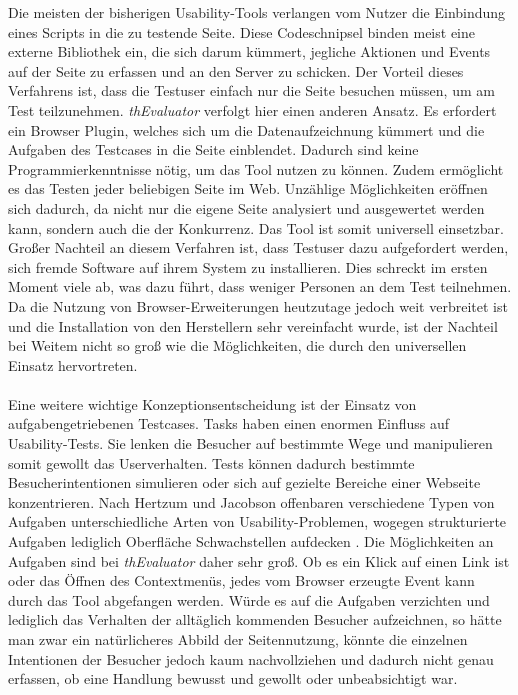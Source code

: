 Die meisten der bisherigen Usability-Tools verlangen vom Nutzer die Einbindung eines Scripts in die zu testende Seite. Diese Codeschnipsel binden meist eine externe Bibliothek ein, die sich darum kümmert, jegliche Aktionen und Events auf der Seite zu erfassen und an den Server zu schicken. Der Vorteil dieses Verfahrens ist, dass die Testuser einfach nur die Seite besuchen müssen, um am Test teilzunehmen. \textit{thEvaluator} verfolgt hier einen anderen Ansatz. Es erfordert ein Browser Plugin, welches sich um die Datenaufzeichnung kümmert und die Aufgaben des Testcases in die Seite einblendet. Dadurch sind keine Programmierkenntnisse nötig, um das Tool nutzen zu können. Zudem ermöglicht es das Testen jeder beliebigen Seite im Web. Unzählige Möglichkeiten eröffnen sich dadurch, da nicht nur die eigene Seite analysiert und ausgewertet werden kann, sondern auch die der Konkurrenz. Das Tool ist somit universell einsetzbar. Großer Nachteil an diesem Verfahren ist, dass Testuser dazu aufgefordert werden, sich fremde Software auf ihrem System zu installieren. Dies schreckt im ersten Moment viele ab, was dazu führt, dass weniger Personen an dem Test teilnehmen. Da die Nutzung von Browser-Erweiterungen heutzutage jedoch weit verbreitet ist und die Installation von den Herstellern sehr vereinfacht wurde, ist der Nachteil bei Weitem nicht so groß wie die Möglichkeiten, die durch den universellen Einsatz hervortreten.\\
\\
Eine weitere wichtige Konzeptionsentscheidung ist der Einsatz von aufgabengetriebenen Testcases. Tasks haben einen enormen Einfluss auf Usability-Tests. Sie lenken die Besucher auf bestimmte Wege und manipulieren somit gewollt das Userverhalten. Tests können dadurch bestimmte Besucherintentionen simulieren oder sich auf gezielte Bereiche einer Webseite konzentrieren. Nach Hertzum und Jacobson offenbaren verschiedene Typen von Aufgaben unterschiedliche Arten von Usability-Problemen, wogegen strukturierte Aufgaben lediglich Oberfläche Schwachstellen aufdecken \cite{anzahlTestpersonen}. Die Möglichkeiten an Aufgaben sind bei \textit{thEvaluator} daher sehr groß. Ob es ein Klick auf einen Link ist oder das Öffnen des Contextmenüs, jedes vom Browser erzeugte Event kann durch das Tool abgefangen werden. Würde es auf die Aufgaben verzichten und lediglich das Verhalten der alltäglich kommenden Besucher aufzeichnen, so hätte man zwar ein natürlicheres Abbild der Seitennutzung, könnte die einzelnen Intentionen der Besucher jedoch kaum nachvollziehen und dadurch nicht genau erfassen, ob eine Handlung bewusst und gewollt oder unbeabsichtigt war.\\
